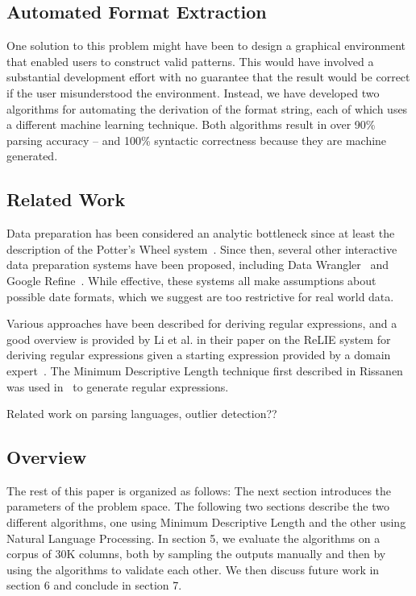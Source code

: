 \subsection{Automated Format Extraction}
One solution to this problem might have been to design a graphical environment that enabled users to construct valid patterns. This would have involved a substantial development effort with no guarantee that the result would be correct if the user misunderstood the environment. Instead, we have developed two algorithms for automating the derivation of the format string, each of which uses a different machine learning technique. Both algorithms result in over 90\% parsing accuracy -- and 100\% syntactic correctness because they are machine generated.


\subsection{Related Work}
Data preparation has been considered an analytic bottleneck since at least the description of the Potter's Wheel system~\cite{Raman:2001}. Since then, several other interactive data preparation systems have been proposed, including Data Wrangler~\cite{Kandel:2011} and Google Refine~\cite{Refine}. While effective, these systems all make assumptions about possible date formats, which we suggest are too restrictive for real world data.

Various approaches have been described for deriving regular expressions, and a good overview is provided by Li et al. in their paper on the ReLIE system for deriving regular expressions given a starting expression provided by a domain expert~\cite{Li:2008}. The Minimum Descriptive Length technique first described in Rissanen~\cite{Rissanen:1978} was used in~\cite{Raman:2001} to generate regular expressions. 

Related work on parsing languages, outlier detection??

\subsection{Overview}
The rest of this paper is organized as follows: The next section introduces the parameters of the problem space. The following two sections describe the two different algorithms, one using Minimum Descriptive Length and the other using Natural Language Processing. In section 5, we evaluate the algorithms on a corpus of 30K columns, both by sampling the outputs manually and then by using the algorithms to validate each other. We then discuss future work in section 6 and conclude in section 7.
